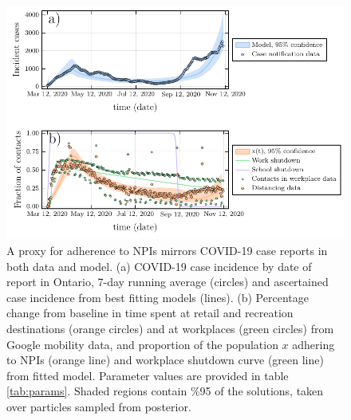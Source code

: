 \begin{figure}
\includegraphics[width=\textwidth]{chapter_1/plot_model.pdf} 
\caption[A proxy for adherence to NPIs mirrors COVID-19 case reports in both data and model.]{A proxy for adherence to NPIs mirrors COVID-19 case reports in both data and model. (a) COVID-19 case incidence by date of report in Ontario, 7-day running average (circles) and ascertained case incidence from best fitting models (lines). (b) Percentage change from baseline in time spent at retail and recreation destinations (orange circles) and at workplaces (green circles) from Google mobility data, and proportion of the population $x$ adhering to NPIs (orange line) and workplace shutdown curve (green line) from fitted model.  Parameter values are provided in table \ref{tab:params}. Shaded regions contain \%95 of the solutions, taken over particles sampled from posterior. }
\label{fig1}
\end{figure}

